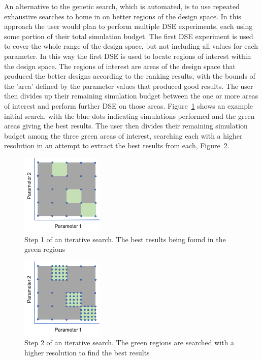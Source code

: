 An alternative to the genetic search, which is automated, is to use repeated exhaustive searches to home in on better regions of the design space.  In this approach the user would plan to perform multiple DSE experiments, each using some portion of their total simulation budget.  The first DSE experiment is used to cover the whole range of the design space, but not including all values for each parameter.   In this way the first DSE is used to locate regions of interest within the design space.  The regions of interest are areas of the design space that produced the better designs according to the ranking results, with the bounds of the 'area' defined by the parameter values that produced good results. The user then divides up their remaining simulation budget between the one or more areas of interest and perform further DSE on those areas.  Figure~\ref{fig:dse:iterative1} shows an example initial search, with the blue dots indicating simulations performed and the green areas giving the best results.  The user then divides their remaining simulation budget among the three green areas of interest, searching each with a higher resolution in an attempt to extract the best results from each, Figure~\ref{fig:dse:iterative2}.

\begin{figure}[p]
	\centering
	
	\includegraphics[width=0.35\textwidth]{figures/Traceability/IterativeStep1}
	\caption{Step 1 of an iterative search.  The best results being found in the green regions}
	\label{fig:dse:iterative1}
\end{figure}

\begin{figure}[p]
	\centering
	\includegraphics[width=0.35\textwidth]{figures/Traceability/IterativeStep2}
	\caption{Step 2 of an iterative search.  The green regions are searched with a higher resolution to find the best results}
	\label{fig:dse:iterative2}
\end{figure}

